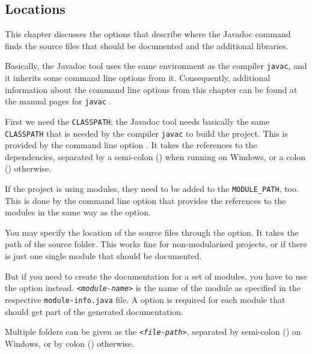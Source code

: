 \subsection{Locations}\label{sec:Locations}
This chapter discusses the options that describe where the Javadoc command finds the source files that should be documented and the additional libraries.

Basically, the Javadoc tool uses the same environment as the \Java compiler \texttt{javac}, and it inherits some command line options from it. Consequently, additional information about the command line options from this chapter can be found at the manual pages for \texttt{javac} \autocite{ORACLE_TOOL:javac}.

First we need the \texttt{CLASSPATH}; the Javadoc tool needs basically the same \texttt{CLASSPATH} that is needed by the \Java compiler \texttt{javac} to build the project. This is provided by the command line option \mbox{}. It takes the references to the dependencies, separated by a semi-colon (\bdq{\texttt{;}}) when running on Windows, or a colon (\bdq{\texttt{:}}) otherwise.

If the project is using modules, they need to be added to the \mbox{\texttt{MODULE\_PATH}}, too. This is done by the command line option \mbox{} that provides the references to the modules in the same way as the \mbox{} option.

You may specify the location of the source files through the \mbox{} option. It takes the path of the source folder. This works fine for non-modularised projects, or if there is just one single module that should be documented.

But if you need to create the documentation for a set of modules, you have to use the option \mbox{} instead. \mbox{\texttt{<\textit{module-name}>}} is the name of the module as specified in the respective \mbox{\texttt{module-info.java}} file. A \mbox{} option is required for each module that should get part of the generated documentation.

Multiple folders can be given as the \mbox{\texttt{<\textit{file-path}>}}, separated by semi-colon (\bdq{\texttt{;}}) on Windows, or by  colon (\bdq{\texttt{:}}) otherwise.

